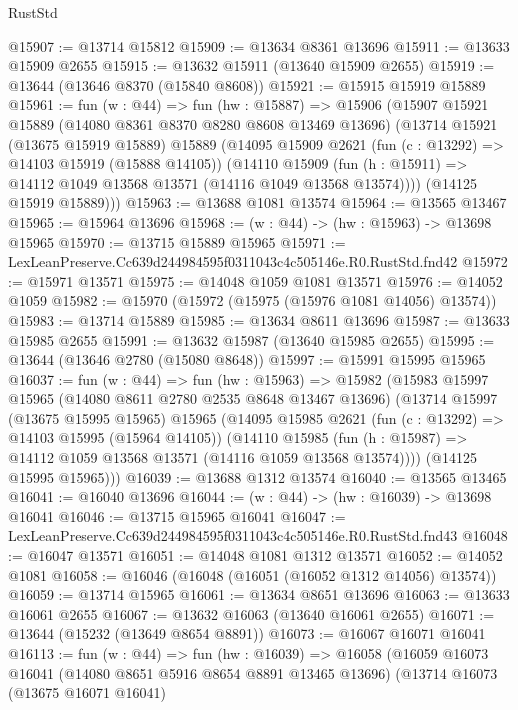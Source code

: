 \begin{lexlean}{RustStd}
\begin{coremodule}
@15907 := @13714 @15812
@15909 := @13634 @8361 @13696
@15911 := @13633 @15909 @2655
@15915 := @13632 @15911 (@13640 @15909 @2655)
@15919 := @13644 (@13646 @8370 (@15840 @8608))
@15921 := @15915 @15919 @15889
@15961 := fun (w : @44) =>
  fun (hw : @15887) =>
  @15906
    (@15907
      @15921
      @15889
      (@14080 @8361 @8370 @8280 @8608 @13469 @13696)
      (@13714
        @15921
        (@13675 @15919 @15889)
        @15889
        (@14095
          @15909
          @2621
          (fun (c : @13292) => @14103 @15919 (@15888 @14105))
          (@14110
            @15909
            (fun (h : @15911) => @14112 @1049 @13568 @13571 (@14116 @1049 @13568 @13574))))
        (@14125 @15919 @15889)))
@15963 := @13688 @1081 @13574
@15964 := @13565 @13467
@15965 := @15964 @13696
@15968 := (w : @44) -> (hw : @15963) -> @13698 @15965
@15970 := @13715 @15889 @15965
@15971 := LexLeanPreserve.Cc639d244984595f0311043c4c505146e.R0.RustStd.fnd42
@15972 := @15971 @13571
@15975 := @14048 @1059 @1081 @13571
@15976 := @14052 @1059
@15982 := @15970 (@15972 (@15975 (@15976 @1081 @14056) @13574))
@15983 := @13714 @15889
@15985 := @13634 @8611 @13696
@15987 := @13633 @15985 @2655
@15991 := @13632 @15987 (@13640 @15985 @2655)
@15995 := @13644 (@13646 @2780 (@15080 @8648))
@15997 := @15991 @15995 @15965
@16037 := fun (w : @44) =>
  fun (hw : @15963) =>
  @15982
    (@15983
      @15997
      @15965
      (@14080 @8611 @2780 @2535 @8648 @13467 @13696)
      (@13714
        @15997
        (@13675 @15995 @15965)
        @15965
        (@14095
          @15985
          @2621
          (fun (c : @13292) => @14103 @15995 (@15964 @14105))
          (@14110
            @15985
            (fun (h : @15987) => @14112 @1059 @13568 @13571 (@14116 @1059 @13568 @13574))))
        (@14125 @15995 @15965)))
@16039 := @13688 @1312 @13574
@16040 := @13565 @13465
@16041 := @16040 @13696
@16044 := (w : @44) -> (hw : @16039) -> @13698 @16041
@16046 := @13715 @15965 @16041
@16047 := LexLeanPreserve.Cc639d244984595f0311043c4c505146e.R0.RustStd.fnd43
@16048 := @16047 @13571
@16051 := @14048 @1081 @1312 @13571
@16052 := @14052 @1081
@16058 := @16046 (@16048 (@16051 (@16052 @1312 @14056) @13574))
@16059 := @13714 @15965
@16061 := @13634 @8651 @13696
@16063 := @13633 @16061 @2655
@16067 := @13632 @16063 (@13640 @16061 @2655)
@16071 := @13644 (@15232 (@13649 @8654 @8891))
@16073 := @16067 @16071 @16041
@16113 := fun (w : @44) =>
  fun (hw : @16039) =>
  @16058
    (@16059
      @16073
      @16041
      (@14080 @8651 @5916 @8654 @8891 @13465 @13696)
      (@13714
        @16073
        (@13675 @16071 @16041)

\end{coremodule}
\end{lexlean}
